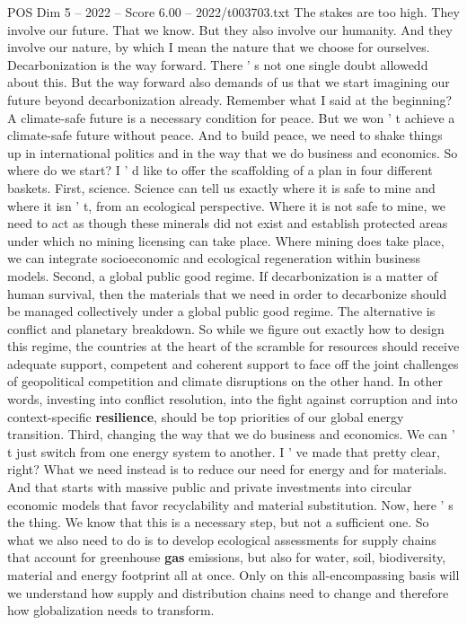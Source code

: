 \begin{textsample}{POS Dim 5 – 2022 – Score 6.00 – 2022/t003703.txt}
The stakes are too high.
They involve our future.
That we know.
But they also involve our humanity.
And they involve our nature, by which I mean the nature that we choose for ourselves.
Decarbonization is the way forward.
There ' s not one single doubt allowedd about this.
But the way forward also demands of us that we start imagining our future beyond decarbonization already.
Remember what I said at the beginning?
A climate-safe future is a necessary condition for peace.
But we won ' t achieve a climate-safe future without peace.
And to build peace, we need to shake things up in international politics and in the way that we do business and economics.
So where do we start?
I ' d like to offer the scaffolding of a plan in four different baskets.
First, science.
Science can tell us exactly where it is safe to mine and where it isn ' t, from an ecological perspective.
Where it is not safe to mine, we need to act as though these minerals did not exist and establish protected areas under which no mining licensing can take place.
Where mining does take place, we can integrate socioeconomic and ecological regeneration within business models.
Second, a global public good regime.
If decarbonization is a matter of human survival, then the materials that we need in order to decarbonize should be managed collectively under a global public good regime.
The alternative is conflict and planetary breakdown.
So while we figure out exactly how to design this regime, the countries at the heart of the scramble for resources should receive adequate support, competent and coherent support to face off the joint challenges of geopolitical competition and climate disruptions on the other hand.
In other words, investing into conflict resolution, into the fight against corruption and into context-specific \textbf{resilience}, should be top priorities of our global energy transition.
Third, changing the way that we do business and economics.
We can ' t just switch from one energy system to another.
I ' ve made that pretty clear, right?
What we need instead is to reduce our need for energy and for materials.
And that starts with massive public and private investments into circular economic models that favor recyclability and material substitution.
Now, here ' s the thing.
We know that this is a necessary step, but not a sufficient one.
So what we also need to do is to develop ecological assessments for supply chains that account for greenhouse \textbf{gas} emissions, but also for water, soil, biodiversity, material and energy footprint all at once.
Only on this all-encompassing basis will we understand how supply and distribution chains need to change and therefore how globalization needs to transform.

\end{textsample}
